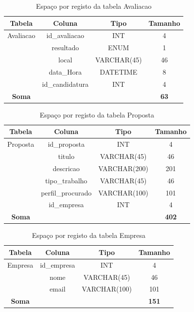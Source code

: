 \documentclass[12pt,a4paper]{article}
\renewcommand{\arraystretch}{1.5}  %
\begin{document}
\begin{table}[H]
\centering
\renewcommand{\arraystretch}{1.2}
\begin{tabular}{|c|c|c|c|}
\hline
\textbf{Tabela} & \textbf{Coluna} & \textbf{Tipo} & \textbf{Tamanho} \\ \hline
Avaliacao & id\_avaliacao & INT & 4 \\ \hline
& resultado & ENUM & 1 \\ \hline
& local & VARCHAR(45) & 46 \\ \hline
& data\_Hora & DATETIME & 8 \\ \hline
& id\_candidatura & INT & 4 \\ \hline
\textbf{Soma} & & & \textbf{63} \\ \hline
\end{tabular}
\caption{Espaço por registo da tabela Avaliacao}
\end{table}

\begin{table}[H]
\centering
\renewcommand{\arraystretch}{1.2}
\begin{tabular}{|c|c|c|c|}
\hline
\textbf{Tabela} & \textbf{Coluna} & \textbf{Tipo} & \textbf{Tamanho} \\ \hline
Proposta & id\_proposta & INT & 4 \\ \hline
& titulo & VARCHAR(45) & 46 \\ \hline
& descricao & VARCHAR(200) & 201 \\ \hline
& tipo\_trabalho & VARCHAR(45) & 46 \\ \hline
& perfil\_procurado & VARCHAR(100) & 101 \\ \hline
& id\_empresa & INT & 4 \\ \hline
\textbf{Soma} & & & \textbf{402} \\ \hline
\end{tabular}
\caption{Espaço por registo da tabela Proposta}
\end{table}

\begin{table}[H]
\centering
\renewcommand{\arraystretch}{1.2}
\begin{tabular}{|c|c|c|c|}
\hline
\textbf{Tabela} & \textbf{Coluna} & \textbf{Tipo} & \textbf{Tamanho} \\ \hline
Empresa & id\_empresa & INT & 4 \\ \hline
& nome & VARCHAR(45) & 46 \\ \hline
& email & VARCHAR(100) & 101 \\ \hline
\textbf{Soma} & & & \textbf{151} \\ \hline
\end{tabular}
\caption{Espaço por registo da tabela Empresa}
\end{table}
\end{document}
